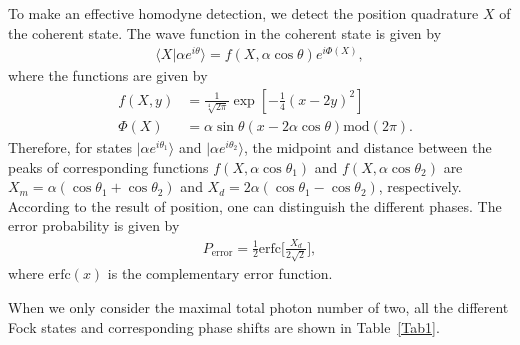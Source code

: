 \documentclass[showpacs,aps,graphicx,twocolumn]{revtex4}
\begin{document}
To make an effective homodyne detection, we detect the
position quadrature $X$ of the coherent state. The wave function in the
coherent state is given by \cite{KNemotoprl2004,SDBarrettpra}
\begin{eqnarray}        \label{homodyne}
\langle X|\alpha e^{i\theta}\rangle=f(X,\alpha \cos\theta)e^{i\Phi(X)},
\end{eqnarray}
where the functions are given by
\begin{eqnarray}        \label{homodynefunction}
&f(X,y)&=\frac{1}{\sqrt[4]{2\pi}}\exp[-\frac{1}{4}(x-2y)^{2}]\nonumber \\ &\Phi(X)&=\alpha\sin\theta(x-2\alpha\cos\theta)\text{mod}(2\pi).
\end{eqnarray}
Therefore, for states $|\alpha e^{i\theta_{1}}\rangle$ and $|\alpha e^{i\theta_{2}}\rangle$, the midpoint and distance between the peaks of corresponding functions $f(X,\alpha\cos\theta_{1})$ and $f(X,\alpha\cos\theta_{2})$ are $X_{m}=\alpha(\cos\theta_{1}+\cos\theta_{2})$ and $X_{d}=2\alpha(\cos\theta_{1}-\cos\theta_{2})$, respectively. According to the result of position, one can distinguish the different phases. The error probability is given by \cite{SDBarrettpra}
\begin{eqnarray}        \label{erfc}
P_{\text{error}}=\frac{1}{2}\text{erfc}\bigg[\frac{X_{d}}{2\sqrt{2}}\bigg],
\end{eqnarray}
where $\text{erfc}(x)$ is the complementary error function.



When we only consider the maximal total photon number of two, all the different Fock states and corresponding phase shifts are shown in Table~\ref{Tab1}.
\end{document}
